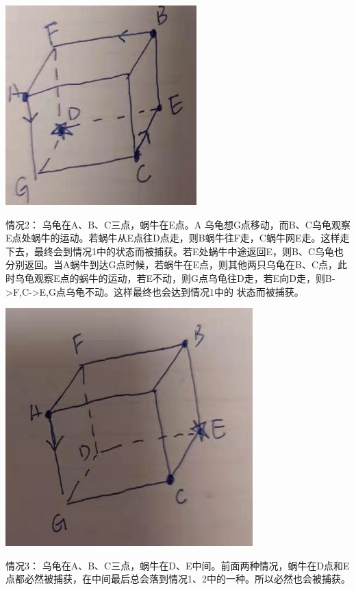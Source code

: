 \documentclass{article}
\begin{document}
\includegraphics[scale=0.5]{cube02.png}

\vspace{60pt}

情况2： 乌龟在A、B、C三点，蜗牛在E点。A 乌龟想G点移动，而B、C乌龟观察E点处蜗牛的运动。若蜗牛从E点往D点走，则B蜗牛往F走，C蜗牛网E走。这样走下去，最终会到情况1中的状态而被捕获。若E处蜗牛中途返回E，则B、C乌龟也分别返回。当A蜗牛到达G点时候，若蜗牛在E点，则其他两只乌龟在B、C点，此时乌龟观察E点的蜗牛的运动，若E不动，则G点乌龟往D走，若E向D走，则B->F,C->E,G点乌龟不动。这样最终也会达到情况1中的 状态而被捕获。

\includegraphics[scale=0.5]{cube03.png}

\vspace{60pt}

情况3： 乌龟在A、B、C三点，蜗牛在D、E中间。前面两种情况，蜗牛在D点和E点都必然被捕获，在中间最后总会落到情况1、2中的一种。所以必然也会被捕获。
\end{document}
